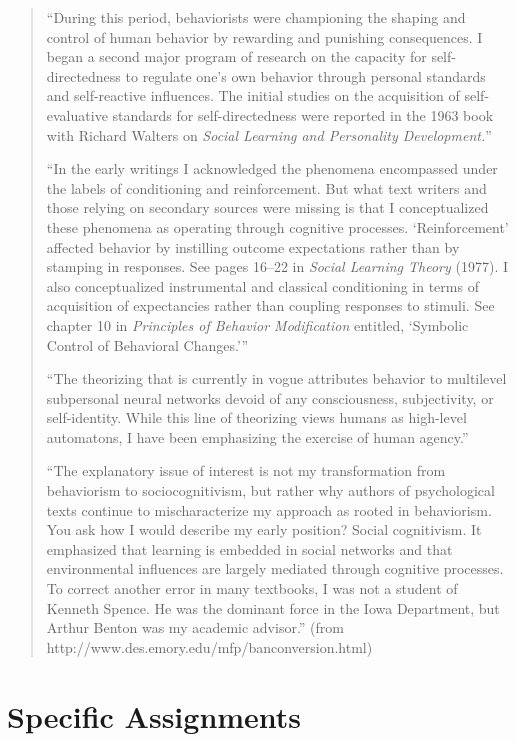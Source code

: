 \begin{refsection}
\begin{quote}
``During this period, behaviorists were championing the shaping and control of human behavior by rewarding and punishing consequences. I began a second major program of research on the capacity for self-directedness to regulate one's own behavior through personal standards and self-reactive influences. The initial studies on the acquisition of self-evaluative standards for self-directedness were reported in the 1963 book with Richard Walters on \emph{Social Learning and Personality Development.}''

``In the early writings I acknowledged the phenomena encompassed under the labels of conditioning and reinforcement. But what text writers and those relying on secondary sources were missing is that I conceptualized these phenomena as operating through cognitive processes. `Reinforcement' affected behavior by instilling outcome expectations rather than by stamping in responses. See pages 16--22 in \emph{Social Learning Theory} (1977). I also conceptualized instrumental and classical conditioning in terms of acquisition of expectancies rather than coupling responses to stimuli. See chapter 10 in \emph{Principles of Behavior Modification} entitled, `Symbolic Control of Behavioral Changes.'''

``The theorizing that is currently in vogue attributes behavior to multilevel subpersonal neural networks devoid of any consciousness, subjectivity, or self-identity. While this line of theorizing views humans as high-level automatons, I have been emphasizing the exercise of human agency.''

``The explanatory issue of interest is not my transformation from behaviorism to sociocognitivism, but rather why authors of psychological texts continue to mischaracterize my approach as rooted in behaviorism. You ask how I would describe my early position? Social cognitivism. It emphasized that learning is embedded in social networks and that environmental influences are largely mediated through cognitive processes. To correct another error in many textbooks, I was not a student of Kenneth Spence. He was the dominant force in the Iowa Department, but Arthur Benton was my academic advisor.'' (from http:\slash \slash www.des.emory.edu\slash mfp\slash banconversion.html)
\end{quote}

\section{Specific Assignments}
\label{specificassignments}


\end{refsection}
